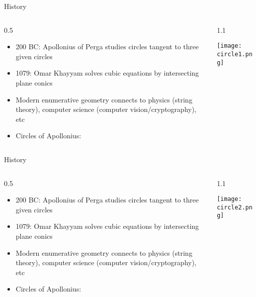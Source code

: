 \documentclass{beamer}
\theoremstyle{definition}
\begin{document}
        \begin{frame}{History}

      \begin{columns}[c]
        \begin{column}{0.5\hsize}
      
          \begin{itemize}
          \item {\texttildelow}200 BC: Apollonius of Perga studies circles tangent to three
            given circles
          \item {\texttildelow}1079: Omar Khayyam solves cubic equations by intersecting
            plane conics
          \item Modern enumerative geometry connects to physics (string theory),
            computer science (computer vision/cryptography), etc
            \item Circles of Apollonius:
          \end{itemize}
        \end{column}
        \begin{column}{1.1\hsize}

            \texttt{[image: circle1.png]}

        \end{column}
      \end{columns}
        \end{frame}

                \begin{frame}{History}

      \begin{columns}[c]
        \begin{column}{0.5\hsize}
      
          \begin{itemize}
          \item {\texttildelow}200 BC: Apollonius of Perga studies circles tangent to three
            given circles
          \item {\texttildelow}1079: Omar Khayyam solves cubic equations by intersecting
            plane conics
          \item Modern enumerative geometry connects to physics (string theory),
            computer science (computer vision/cryptography), etc
            \item Circles of Apollonius:
          \end{itemize}
        \end{column}
        \begin{column}{1.1\hsize}

            \texttt{[image: circle2.png]}

        \end{column}
      \end{columns}
                \end{frame}
\end{document}
